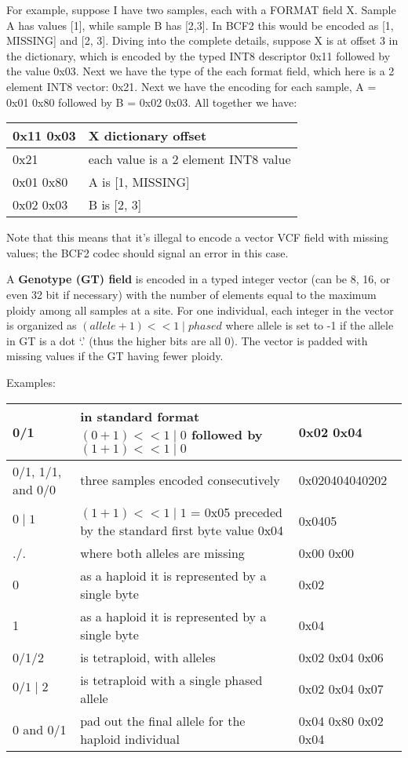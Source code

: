 \documentclass[8pt]{article}
\begin{document}
For example, suppose I have two samples, each with a FORMAT field X.  Sample A has values [1], while sample B has [2,3].  In BCF2 this would be encoded as [1, MISSING] and [2, 3].  Diving into the complete details, suppose X is at offset 3 in the dictionary, which is encoded by the typed INT8 descriptor 0x11 followed by the value 0x03.  Next we have the type of the each format field, which here is a 2 element INT8 vector: 0x21.  Next we have the encoding for each sample, A = 0x01 0x80 followed by B = 0x02 0x03.  All together we have:

\vspace{0.3cm}
\begin{tabular}{|p{2cm} | l |} \hline
0x11 0x03 & X dictionary offset \\ \hline
0x21 & each value is a 2 element INT8 value \\ \hline
0x01 0x80 & A is [1, MISSING] \\ \hline
0x02 0x03 & B is [2, 3] \\ \hline
\end{tabular}
\vspace{0.3cm}

Note that this means that it's illegal to encode a vector VCF field with missing values; the BCF2 codec should signal an error in this case.

\vspace{0.3cm}
A \textbf{Genotype (GT) field} is encoded in a typed integer vector (can be 8, 16, or even 32 bit if necessary) with the number of elements equal to the maximum ploidy among all samples at a site.  For one individual, each integer in the vector is organized as $(allele+1) << 1 \mid phased$ where allele is set to -1 if the allele in GT is a dot `.' (thus the higher bits are all 0).  The vector is padded with missing values if the GT having fewer ploidy.

Examples:

\vspace{0.3cm}
\small
\begin{tabular}{|p{2.5cm} | p{10cm} | p{3cm}|} \hline
0/1 & in standard format $(0 + 1) << 1 \mid 0$ followed by $(1 + 1) << 1 \mid 0$ & 0x02 0x04 \\ \hline
0/1, 1/1, and 0/0 & three samples encoded consecutively & 0x020404040202 \\ \hline
$0\mid1$ & $(1 + 1) << 1 \mid 1$ = 0x05 preceded by the standard first byte value 0x04 & 0x0405 \\ \hline
./. & where both alleles are missing & 0x00 0x00 \\ \hline
0 & as a haploid it is represented by a single byte & 0x02 \\ \hline
1 & as a haploid it is represented by a single byte & 0x04 \\ \hline
0/1/2 & is tetraploid, with alleles & 0x02 0x04 0x06 \\ \hline
$0/1\mid2$ & is tetraploid with a single phased allele & 0x02 0x04 0x07 \\ \hline
0 and 0/1 & pad out the final allele for the haploid individual & 0x04 0x80 0x02 0x04\\ \hline
\end{tabular}
\normalsize
\end{document}
